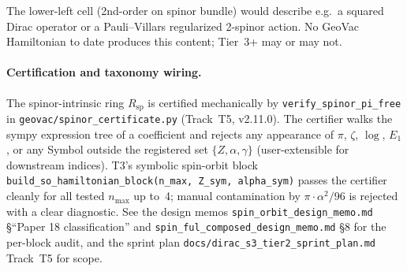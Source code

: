 The lower-left cell (2nd-order on spinor bundle) would describe
e.g.\ a squared Dirac operator or a Pauli--Villars regularized 2-spinor
action. No GeoVac Hamiltonian to date produces this content; Tier~3+
may or may not.

\paragraph{Certification and taxonomy wiring.}
The spinor-intrinsic ring $R_{\mathrm{sp}}$ is certified mechanically by
\texttt{verify\_spinor\_pi\_free} in
\texttt{geovac/spinor\_certificate.py}
(Track~T5, v2.11.0). The certifier walks the sympy expression tree of a
coefficient and rejects any appearance of $\pi$, $\zeta$, $\log$, $E_1$,
or any Symbol outside the registered set $\{Z, \alpha, \gamma\}$
(user-extensible for downstream indices). T3's symbolic spin-orbit block
\texttt{build\_so\_hamiltonian\_block(n\_max, Z\_sym, alpha\_sym)} passes the
certifier cleanly for all tested $n_{\max}$ up to~4; manual contamination
by $\pi \cdot \alpha^2 / 96$ is rejected with a clear diagnostic. See
the design memos \texttt{spin\_orbit\_design\_memo.md} §``Paper 18
classification'' and \texttt{spin\_ful\_composed\_design\_memo.md} §8 for
the per-block audit, and the sprint plan
\texttt{docs/dirac\_s3\_tier2\_sprint\_plan.md} Track~T5 for scope.

